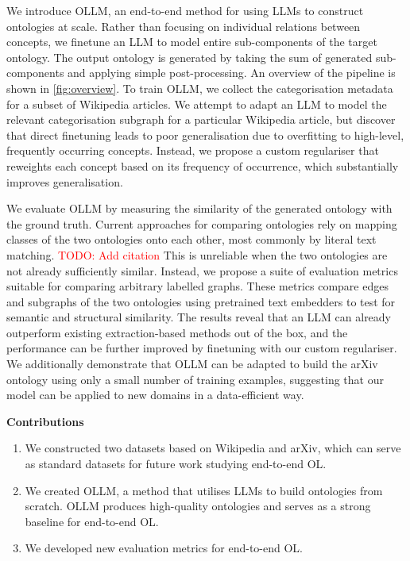 \documentclass{article}
\newcommand{\todo}[1]{\textcolor{red}{TODO: #1}}
\newcommand{\name}{{OLLM}\xspace}
\begin{document}


We introduce \name, an end-to-end method for using LLMs to construct ontologies at scale. Rather than focusing on individual relations between concepts, we finetune an LLM to model entire sub-components of the target ontology. The output ontology is generated by taking the sum of generated sub-components and applying simple post-processing. An overview of the pipeline is shown in \cref{fig:overview}. To train \name, we collect the categorisation metadata for a subset of Wikipedia articles. We attempt to adapt an LLM to model the relevant categorisation subgraph for a particular Wikipedia article, but discover that direct finetuning leads to poor generalisation due to overfitting to high-level, frequently occurring concepts. Instead, we propose a custom regulariser that reweights each concept based on its frequency of occurrence, which substantially improves generalisation.

We evaluate \name by measuring the similarity of the generated ontology with the ground truth. Current approaches for comparing ontologies rely on mapping classes of the two ontologies onto each other, most commonly by literal text matching. \todo{Add citation} This is unreliable when the two ontologies are not already sufficiently similar. Instead, we propose a suite of evaluation metrics suitable for comparing arbitrary labelled graphs. These metrics compare edges and subgraphs of the two ontologies using pretrained text embedders to test for semantic and structural similarity. The results reveal that an LLM can already outperform existing extraction-based methods out of the box, and the performance can be further improved by finetuning with our custom regulariser. We additionally demonstrate that \name can be adapted to build the arXiv ontology using only a small number of training examples, suggesting that our model can be applied to new domains in a data-efficient way.

\textbf{Contributions}
\begin{enumerate}
    \item We constructed two datasets based on Wikipedia and arXiv, which can serve as standard datasets for future work studying end-to-end OL.
    \item We created \name, a method that utilises LLMs to build ontologies from scratch. \name produces high-quality ontologies and serves as a strong baseline for end-to-end OL.
    \item We developed new evaluation metrics for end-to-end OL.
\end{enumerate}
\end{document}

